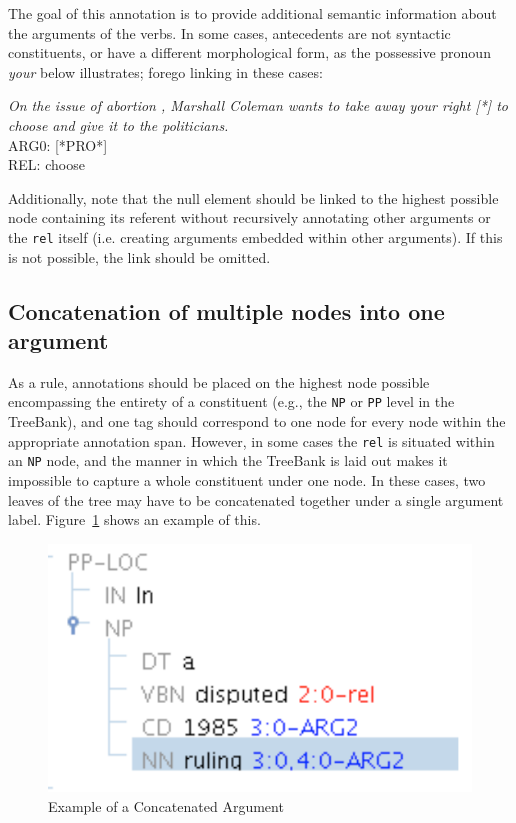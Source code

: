 \documentclass[11pt]{report}
\begin{document}
The goal of this annotation is to provide additional semantic information about the arguments of the verbs.  In some cases, antecedents are not syntactic constituents, or have a different morphological form, as the possessive pronoun \textit{your} below illustrates; forego linking in these cases:

\textit{On the issue of abortion , Marshall Coleman wants  to take away your right  [*] to choose and give it to the politicians.}\\
ARG0:          [*PRO*]\\
REL:           choose

Additionally, note that the null element should be linked to the highest possible node containing its referent without recursively annotating other arguments or the \texttt{rel} itself (i.e. creating arguments embedded within other arguments).  If this is not possible, the link should be omitted. 

\subsection{Concatenation of multiple nodes into one argument}
\label{sec: concatenation}
As a rule, annotations should be placed on the highest node possible encompassing the entirety of a constituent (e.g., the \texttt{NP} or \texttt{PP} level in the TreeBank), and one tag should correspond to one node for every node within the appropriate annotation span.  However, in some cases the \texttt{rel} is situated within an \texttt{NP} node, and the manner in which the TreeBank is laid out makes it impossible to capture a whole constituent under one node.  In these cases, two leaves of the tree may have to be concatenated together under a single argument label.  Figure~\ref{fig: concatarg} shows an example of this. 

\begin{figure}[htbp]
\centering
\includegraphics[scale=0.3]{img/concatarg.png}
\caption{Example of a Concatenated Argument}
\label{fig: concatarg}
\end{figure}
\end{document}
